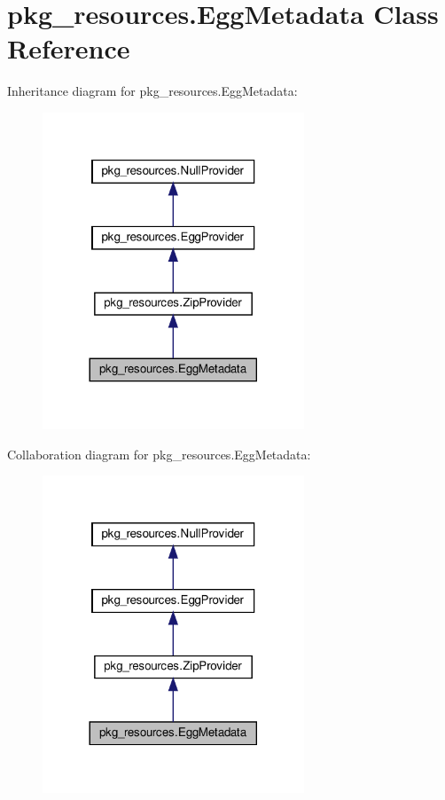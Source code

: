 \hypertarget{classpkg__resources_1_1EggMetadata}{}\section{pkg\+\_\+resources.\+Egg\+Metadata Class Reference}
\label{classpkg__resources_1_1EggMetadata}


Inheritance diagram for pkg\+\_\+resources.\+Egg\+Metadata\+:
\nopagebreak
\begin{figure}[H]
\begin{center}
\leavevmode
\includegraphics[width=221pt]{classpkg__resources_1_1EggMetadata__inherit__graph}
\end{center}
\end{figure}


Collaboration diagram for pkg\+\_\+resources.\+Egg\+Metadata\+:
\nopagebreak
\begin{figure}[H]
\begin{center}
\leavevmode
\includegraphics[width=221pt]{classpkg__resources_1_1EggMetadata__coll__graph}
\end{center}
\end{figure}
